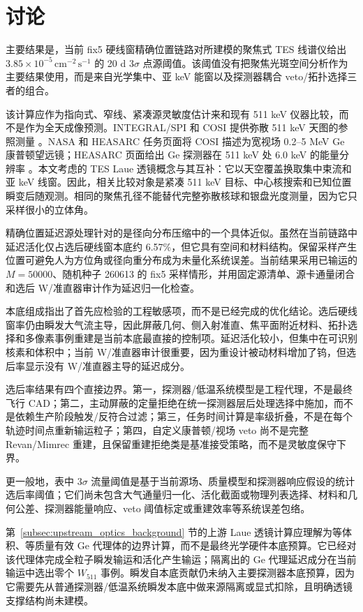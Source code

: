 \documentclass[preprint,12pt]{elsarticle}
\newcommand{\cms}{\,\mathrm{cm^{-2}\,s^{-1}}}
\newcommand{\wii}{W_{511}}
\begin{document}
\section{讨论}
\label{sec:discussion}

主要结果是，当前 fix5 硬线窗精确位置链路对所建模的聚焦式 TES 线谱仪给出 $3.85\times10^{-5}\cms$ 的 20 d $3\sigma$ 点源阈值。该阈值没有把聚焦光斑空间分析作为主要结果使用，而是来自光学集中、亚 keV 能窗以及探测器耦合 veto/拓扑选择三者的组合。

该计算应作为指向式、窄线、紧凑源灵敏度估计来和现有 511 keV 仪器比较，而不是作为全天成像预测。INTEGRAL/SPI 和 COSI 提供弥散 511 keV 天图的参照测量 \cite{Siegert2016AA,Kierans2020,Siegert2020COSI,Yoneda2025}。NASA 和 HEASARC 任务页面将 COSI 描述为宽视场 0.2--5 MeV Ge 康普顿望远镜；HEASARC 页面给出 Ge 探测器在 511 keV 处 6.0 keV 的能量分辨率 \cite{NASACOSI,HEASARCCOSI}。本文考虑的 TES Laue 透镜概念与其互补：它以天空覆盖换取集中束流和亚 keV 线窗。因此，相关比较对象是紧凑 511 keV 目标、中心核搜索和已知位置瞬变后随观测。相同的聚焦孔径不能替代完整弥散核球和银盘光度测量，因为它只采样很小的立体角。

精确位置延迟源处理针对的是径向分布压缩中的一个具体近似。虽然在当前链路中延迟活化仅占选后硬线窗本底约 6.57\%，但它具有空间和材料结构。保留采样产生位置可避免人为方位角或径向重分布成为未量化系统误差。当前结果采用已输运的 $M=50000$、随机种子 260613 的 fix5 采样情形，并用固定源清单、源卡通量闭合和选后 W/准直器审计作为延迟归一化检查。

本底组成指出了首先应检验的工程敏感项，而不是已经完成的优化结论。选后硬线窗率仍由瞬发大气流主导，因此屏蔽几何、侧入射准直、焦平面附近材料、拓扑选择和多像素事例重建是当前本底最直接的控制项。延迟活化较小，但集中在可识别核素和体积中；当前 W/准直器审计很重要，因为重设计被动材料增加了钨，但选后率显示没有 W/准直器主导的延迟成分。

选后率结果有四个直接边界。第一，探测器/低温系统模型是工程代理，不是最终飞行 CAD；第二，主动屏蔽的定量拒绝在统一探测器层后处理选择中施加，而不是依赖生产阶段触发/反符合过滤；第三，任务时间计算是率级折叠，不是在每个轨迹时间点重新输运粒子；第四，自定义康普顿/视场 veto 尚不是完整 Revan/Mimrec 重建，且保留重建拒绝类是基准接受策略，而不是灵敏度保守下界。

更一般地，表中 $3\sigma$ 流量阈值是基于当前源场、质量模型和探测器响应假设的统计选后率阈值；它们尚未包含大气通量归一化、活化截面或物理列表选择、材料和几何公差、探测器能量响应、veto 阈值标定或重建效率等系统误差包络。

第~\ref{subsec:upstream_optics_background} 节的上游 Laue 透镜计算应理解为等体积、等质量有效 Ge 代理体的边界计算，而不是最终光学硬件本底预算。它已经对该代理体完成全粒子瞬发输运和活化产生输运；隔离出的 Ge 代理延迟成分在当前输运中选出零个 $\wii$ 事例。瞬发自本底贡献仍未纳入主要探测器本底预算，因为它需要先从普通探测器/低温系统瞬发本底中做来源隔离或显式扣除，且明确透镜支撑结构尚未建模。
\end{document}
